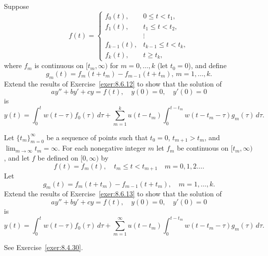 \documentclass{ximera}
\begin{document}
\begin{problem}\label{exer:8.6.13}
Suppose
$$
f(t)=\left\{\begin{array}{cl}
 f_0(t),&0\le t < t_1,\\[5pt]
 f_1(t),&t_1\le t < t_2,\\
&\vdots\\
f_{k-1}(t),&t_{k-1}\le t < t_k,\\
 f_k(t),&t\ge t_k,
\end{array}\right.
$$
where  $f_m$ is continuous on $[t_m,\infty)$ for $m=0,\dots,k$
(let $t_0=0$),  and define
$$
g_m(t)=f_m(t+t_m)-f_{m-1}(t+t_m) ,\, m=1,\dots,k.
$$
Extend the results of Exercise~\ref{exer:8.6.12} to show that
the solution of
$$
ay''+by'+cy=f(t),\quad y(0)=0,\quad y'(0)=0
$$
is
$$
y(t)=\int_0^t w(t-\tau)f_0(\tau)\,d\tau+\sum_{m=1}^ku(t-t_m)
\int_0^{t-t_m}w(t-t_m-\tau)g_m(\tau)\,d\tau.
$$
\end{problem}

\begin{problem}\label{exer:8.6.14}
Let $\{t_m\}_{m=0}^\infty$  be a sequence of points such that $t_0=0$,
$t_{m+1}>t_m$,
and $\lim_{m\to\infty}t_m=\infty$. For each nonegative integer $m$
let $f_m$ be continuous on $[t_m,\infty)$, and let
 $f$ be defined on $[0,\infty)$ by
$$
f(t)=f_m(t),\quad t_m\le t<t_{m+1}\quad  m=0,1,2\dots.
$$
Let
$$
g_m(t)=f_m(t+t_m)-f_{m-1}(t+t_m),\quad  m=1,\dots,k.
$$
Extend the results of Exercise~\ref{exer:8.6.13} to show that the solution
of
$$
ay''+by'+cy=f(t),\quad y(0)=0,\quad y'(0)=0
$$
is
$$
y(t)=\int_0^t w(t-\tau)f_0(\tau)\,d\tau+\sum_{m=1}^\infty u(t-t_m)
\int_0^{t-t_m}w(t-t_m-\tau)g_m(\tau)
\,d\tau.
$$
\begin{hint}
  See Exercise~\ref{exer:8.4.30}. 
\end{hint}

\end{problem}
\end{document}
